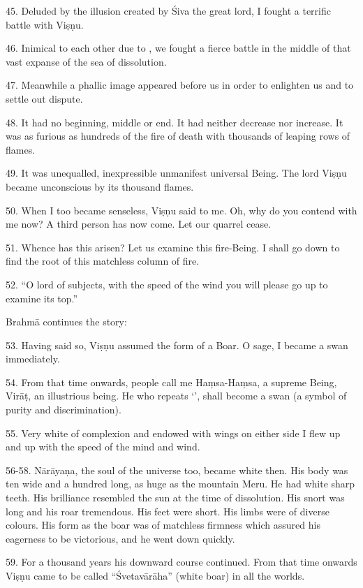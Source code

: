45. Deluded by the illusion created by Śiva the great lord, I fought a terrific
battle with Viṣṇu.

46. Inimical to each other due to , we fought a fierce battle in
the middle of that vast expanse of the sea of dissolution.

47. Meanwhile a phallic image appeared before us in order to enlighten us and to
settle out dispute.

48. It had no beginning, middle or end. It had neither decrease nor increase. It
was as furious as hundreds of the fire of death with thousands of leaping rows
of flames.

49. It was unequalled, inexpressible unmanifest universal Being. The lord Viṣṇu
became unconscious by its thousand flames.

50. When I too became senseless, Viṣṇu said to me. Oh, why do you contend with
me now? A third person has now come. Let our quarrel cease.

51. Whence has this arisen? Let us examine this fire-Being. I shall go down to
find the root of this matchless column of fire.

52. “O lord of subjects, with the speed of the wind you will please go up to
examine its top.”

Brahmā continues the story:

53. Having said so, Viṣṇu assumed the form of a Boar. O sage, I became a swan
immediately.

54. From that time onwards, people call me Haṃsa-Haṃsa, a supreme Being, Virāṭ,
an illustrious being. He who repeats ‘’, shall become a swan (a
symbol of purity and discrimination).

55. Very white of complexion and endowed with wings on either side I flew up and
up with the speed of the mind and wind.

56-58. Nārāyaṇa, the soul of the universe too, became white then. His body was
ten  wide and a hundred  long, as huge as the mountain
Meru. He had white sharp teeth. His brilliance resembled the sun at the time of
dissolution. His snort was long and his roar tremendous. His feet were short.
His limbs were of diverse colours. His form as the boar was of matchless
firmness which assured his eagerness to be victorious, and he went down quickly.

59. For a thousand years his downward course continued. From that time onwards
Viṣṇu came to be called “Śvetavārāha” (white boar) in all the worlds.

